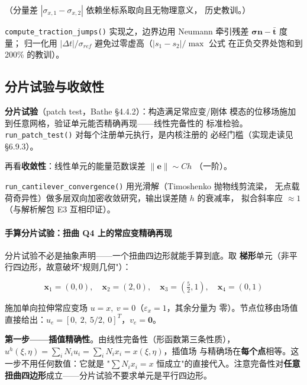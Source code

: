 \documentclass[12pt,a4paper]{ctexart}
\newcommand{\fem}{\Verb}
\begin{document}
（分量差 $|\sigma_{x,1}-\sigma_{x,2}|$ 依赖坐标系取向且无物理意义，
历史教训。）

\fem|compute_traction_jumps()| 实现之，边界边用 Neumann
牵引残差 $\boldsymbol{\sigma}\mathbf{n} - \bar{\mathbf{t}}$ 度量；
归一化用 $|\Delta t|/\sigma_{ref}$ 避免过零虚高（$|s_1-s_2|/\max$ 公式
在正负交界处饱和到 200\% 的教训）。

\subsection{分片试验与收敛性}

\textbf{分片试验}（patch test，Bathe §4.4.2）：构造满足常应变/刚体
模态的位移场施加到任意网格，验证单元能否精确再现——线性完备性的
标准检验。\fem|run_patch_test()| 对每个注册单元执行，是内核注册的
必经门槛（实现走读见 §6.9.3）。

再看\textbf{收敛性}：线性单元的能量范数误差 $\|\mathbf{e}\| \sim C h$
（一阶）。

\fem|run_cantilever_convergence()| 用光滑解（Timoshenko 抛物线剪流梁，
无点载荷奇异性）做多层双向加密收敛研究，输出误差随 $h$ 的衰减率，
拟合斜率应 $\approx 1$（与解析解包 E3 互相印证）。

\paragraph{手算分片试验：扭曲 Q4 上的常应变精确再现}

分片试验不必是抽象声明——一个扭曲四边形就能手算到底。取
\textbf{梯形}单元（非平行四边形，故意破坏"规则几何"）：

\begin{equation}
\mathbf{x}_1=(0,0),\quad \mathbf{x}_2=(2,0),\quad
\mathbf{x}_3=\left(\tfrac{5}{2},1\right),\quad \mathbf{x}_4=(0,1)
\end{equation}

施加单向拉伸常应变场 $u = x,\ v = 0$（$\varepsilon_x=1$，其余分量为
零）。节点位移由场值直接给出：$u_e = [0,\ 2,\ 5/2,\ 0]^T$，$v_e =
\mathbf{0}$。

\textbf{第一步——插值精确性}。由线性完备性（形函数第三条性质），
$u^h(\xi,\eta) = \sum_i N_i u_i = \sum_i N_i x_i = x(\xi,\eta)$，插值场
与精确场在\textbf{每个点}相等。这一步不用任何数值：它就是
"$\sum N_i x_i = x$ 恒成立"的直接代入。注意完备性对\textbf{任意
扭曲四边形}成立——分片试验不要求单元是平行四边形。
\end{document}
